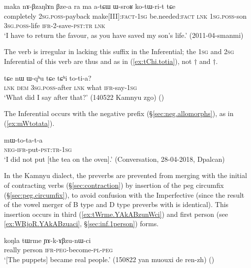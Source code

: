 \begin{exe}
\ex \label{ex:WsroR.kotWrit}
\gll maka nɤ-βzaŋlɤn βze-a ra ma a-tɕɯ ɯ-sroʁ ko-tɯ-ri-t tɕe \\
completely \textsc{2sg}.\textsc{poss}-payback make[III]:\textsc{fact}-\textsc{1sg} be.needed:\textsc{fact} \textsc{lnk} \textsc{1sg}.\textsc{poss}-son \textsc{3sg}.\textsc{poss}-life \textsc{ifr}-2-save-\textsc{pst}:\textsc{tr} \textsc{lnk} \\
\glt `I have to return the favour, as you have saved my son's life.' (2011-04-smanmi)
\end{exe}

The verb  is irregular in lacking this suffix in the Inferential; the \textsc{1sg} and \textsc{2sg} Inferential of this verb are thus  and  as in (\ref{ex:tChi.totia}), not $\dagger$ and $\dagger$.

\begin{exe}
\ex \label{ex:tChi.totia}
\gll tɕe nɯ ɯ-qʰu tɕe tɕʰi to-ti-a? \\
\textsc{lnk} \textsc{dem} \textsc{3sg}.\textsc{poss}-after \textsc{lnk} what \textsc{ifr}-say-\textsc{1sg} \\
\glt `What did I say after that?' (140522 Kamnyu zgo) ()
\end{exe}
 
The Inferential occurs with the negative prefix  (§\ref{sec:neg.allomorphs}), as in (\ref{ex:mWtotata}).

\begin{exe}
\ex \label{ex:mWtotata}
\gll mɯ-to-ta-t-a \\
\textsc{neg}-\textsc{ifr}-put-\textsc{pst}:\textsc{tr}-\textsc{1sg} \\
\glt `I did not put [the tea on the oven].' (Conversation, 28-04-2018, Dpalcan)
\end{exe}

In the Kamnyu dialect, the preverbs are prevented from merging with the initial  of contracting verbs (§\ref{sec:contraction}) by insertion of the peg circumfix (§\ref{sec:peg.circumfix}), to avoid confusion with the Imperfective (since the result of the vowel merger of B type and D type preverbs with  is identical). This insertion occurs in third (\ref{ex:tWrme.YAkABzunWci}) and first person (see \ref{ex:WRjoR.YAkABzuaci}, §\ref{sec:inf.1person}) forms.


\begin{exe}
\ex \label{ex:tWrme.YAkABzunWci}
\gll koŋla tɯrme ɲɤ-k-ɤβzu-nɯ-ci \\
really person \textsc{ifr}-\textsc{peg}-become-\textsc{pl}-\textsc{peg} \\
\glt `[The puppets] became real people.' (150822 yan muouxi de ren-zh) ()
\end{exe}
 
